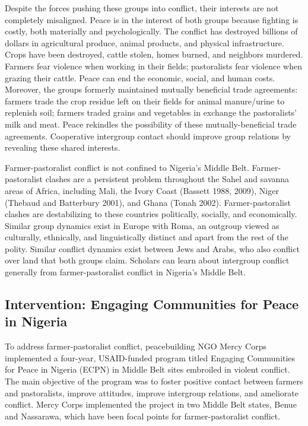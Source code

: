 \documentclass[11pt]{article}
\begin{document}
Despite the forces pushing these groups into conflict, their interests
are not completely misaligned. Peace is in the interest of both groups
because fighting is costly, both materially and psychologically. The
conflict has destroyed billions of dollars in agricultural produce,
animal products, and physical infrastructure. Crops have been destroyed,
cattle stolen, homes burned, and neighbors murdered. Farmers fear
violence when working in their fields; pastoralists fear violence when
grazing their cattle. Peace can end the economic, social, and human
costs. Moreover, the groups formerly maintained mutually beneficial
trade agreements: farmers trade the crop residue left on their fields
for animal manure/urine to replenish soil; farmers traded grains and
vegetables in exchange the pastoralists' milk and meat. Peace rekindles
the possibility of these mutually-beneficial trade agreements.
Cooperative intergroup contact should improve group relations by
revealing these shared interests.

Farmer-pastoralist conflict is not confined to Nigeria's Middle Belt.
Farmer-pastoralist clashes are a persistent problem throughout the Sahel
and savanna areas of Africa, including Mali, the Ivory Coast (Bassett
1988, 2009), Niger (Thebaud and Batterbury 2001), and Ghana (Tonah
2002). Farmer-pastoralist clashes are destabilizing to these countries
politically, socially, and economically. Similar group dynamics exist in
Europe with Roma, an outgroup viewed as culturally, ethnically, and
linguistically distinct and apart from the rest of the polity. Similar
conflict dynamics exist between Jews and Arabs, who also conflict over
land that both groups claim. Scholars can learn about intergroup
conflict generally from farmer-pastoralist conflict in Nigeria's Middle
Belt.

\hypertarget{intervention-engaging-communities-for-peace-in-nigeria}{%
\subsection{Intervention: Engaging Communities for Peace in
Nigeria}\label{intervention-engaging-communities-for-peace-in-nigeria}}

To address farmer-pastoralist conflict, peacebuilding NGO Mercy Corps
implemented a four-year, USAID-funded program titled Engaging
Communities for Peace in Nigeria (ECPN) in Middle Belt sites embroiled
in violent conflict. The main objective of the program was to foster
positive contact between farmers and pastoralists, improve attitudes,
improve intergroup relations, and ameliorate conflict. Mercy Corps
implemented the project in two Middle Belt states, Benue and Nassarawa,
which have been focal points for farmer-pastoralist conflict.
\end{document}
